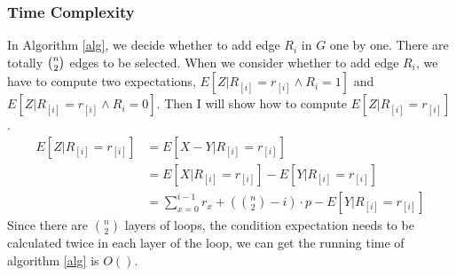 \subsubsection{Time Complexity }
In Algorithm \ref{alg}, we decide whether to add edge $R_i$ in $G$ one by one. There are totally $\tbinom{n}{2}$ edges to be selected.
When we consider whether to add edge $R_i$, we have to compute two expectations, $E[Z|R_{[i]}=r_{[i]}\wedge R_i=1]$ and $E[Z|R_{[i]}=r_{[i]}\wedge R_i=0]$. Then I will show how to compute $E[Z|R_{[i]}=r_{[i]}]$.
\begin{align}
    \nonumber E[Z|R_{[i]}=r_{[i]}]&=E[X-Y|R_{[i]}=r_{[i]}]\\
    \nonumber &=E[X|R_{[i]}=r_{[i]}]-E[Y|R_{[i]}=r_{[i]}]\\
    \nonumber &=\sum_{x=0}^{i-1}r_x + (\binom{n}{2}-i)\cdot p -E[Y|R_{[i]}=r_{[i]}]
\end{align}
Since there are $\binom{n}{2}$ layers of loops, the condition expectation needs to be calculated twice in each layer of the loop, we can get the running time of algorithm \ref{alg} is $O()$.
